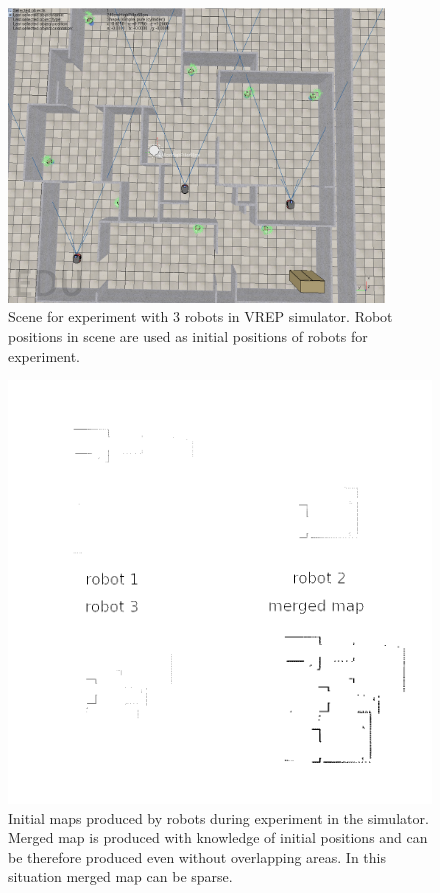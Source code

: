 \begin{figure}
    \centering
    \includegraphics[width=3.93in]{../img/minimal-overlapping-area-scene.png}
    \caption[Scene for experiment with $3$ robots.]{Scene for experiment with $3$ robots in \gls{VREP} simulator. Robot positions in scene are used as initial positions of robots for experiment.}
    \label{fig:minimal-overlapping-area-scene}
\end{figure}

\begin{figure}
    \centering
    \includegraphics[width=\textwidth]{../img/merging-with-known-initial-positions-begin.png}
    \caption[Initial maps produced by robots in the simulator.]{Initial maps produced by robots during experiment in the simulator. Merged map is produced with knowledge of initial positions and can be therefore produced even without overlapping areas. In this situation merged map can be sparse.}
    \label{fig:merging-with-known-initial-positions-begin}
\end{figure}

